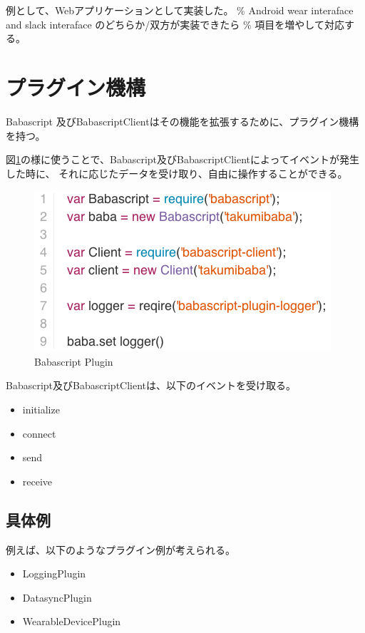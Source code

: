 例として、Webアプリケーションとして実装した。 \% Android wear interaface
and slack interaface のどちらか/双方が実装できたら \%
項目を増やして対応する。

\section{プラグイン機構}\label{ux30d7ux30e9ux30b0ux30a4ux30f3ux6a5fux69cb}

Babascript
及びBabascriptClientはその機能を拡張するために、プラグイン機構を持つ。

図\ref{fig:babascript_plugin}の様に使うことで、Babascript及びBabascriptClientによってイベントが発生した時に、
それに応じたデータを受け取り、自由に操作することができる。

\begin{figure}[htbp]
  \begin{center}
  \includegraphics[width=.7\linewidth,bb=0 0 416 226]{images/babascript_plugin.js.png}
  \end{center}
  \caption{Babascript Plugin}
  \label{fig:babascript_plugin}
\end{figure}

Babascript及びBabascriptClientは、以下のイベントを受け取る。

\begin{itemize}
\itemsep1pt\parskip0pt
\item
  initialize
\item
  connect
\item
  send
\item
  receive
\end{itemize}

\subsection{具体例}\label{ux5177ux4f53ux4f8b}

例えば、以下のようなプラグイン例が考えられる。

\begin{itemize}
\itemsep1pt\parskip0pt
\item
  LoggingPlugin
\item
  DatasyncPlugin
\item
  WearableDevicePlugin
\end{itemize}

